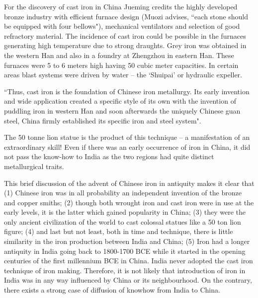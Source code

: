 For the discovery of cast iron in China Jueming credits the highly developed bronze industry with efficient furnace design (Muozi advises, ``each stone should be equipped with four bellows"), mechanical ventilators and selection of good refractory material. The incidence of cast iron could be possible in the furnaces generating high temperature due to strong draughts. Grey iron was obtained in the western Han and also in a foundry at Zhengzhou in eastern Han. These furnaces were 5 to 6 meters high having 50 cubic meter capacities. In certain areas blast systems were driven by water – the `Shuipai' or hydraulic expeller.

{\footnotesize ``Thus, cast iron is the foundation of Chinese iron metallurgy. Its early invention and wide application created a specific style of its own with the invention of puddling iron in western Han and soon afterwards the uniquely Chinese guan steel, China firmly established its specific iron and steel system".}

The 50 tonne lion statue is the product of this technique – a manifestation of an extraordinary skill! Even if there was an early occurrence of iron in China, it did not pass the know-how to India as the two regions had quite distinct metallurgical traits.

\newpage

This brief discussion of the advent of Chinese iron in antiquity makes it clear that (1) Chinese iron was in all probability an independent invention of the bronze and copper smiths; (2) though both wrought iron and cast iron were in use at the early levels, it is the latter which gained popularity in China; (3) they were the only ancient civilization of the world to cast colossal statues like a 50 ton lion figure; (4) and last but not least, both in time and technique, there is little similarity in the iron production between India and China; (5) Iron had a longer antiquity in India going back to 1800-1700 BCE while it started in the opening centuries of the first millennium BCE in China. India never adopted the cast iron technique of iron making. Therefore, it is not likely that introduction of iron in India was in any way influenced by China or its neighbourhood. On the contrary, there exists a strong case of diffusion of knowhow from India to China. 

